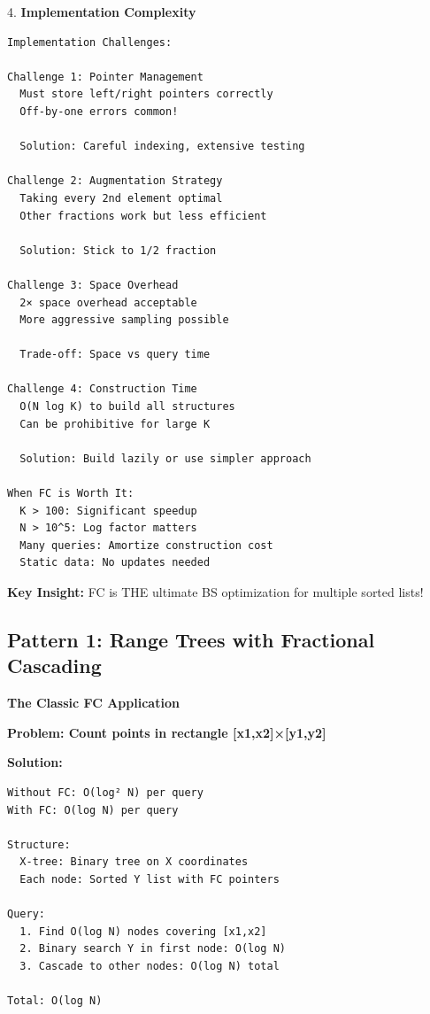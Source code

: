\documentclass[11pt,a4paper,oneside]{book}
\begin{document}
\begin{tcolorbox}[
    enhanced,breakable,
    colback=white,
    colframe=deepblue,
    boxrule=1.5pt,
    arc=3mm,
    title=\textbf{The Ultimate Search Optimization}
]
4. \textbf{Implementation Complexity}
\begin{verbatim}
Implementation Challenges:

Challenge 1: Pointer Management
  Must store left/right pointers correctly
  Off-by-one errors common!
  
  Solution: Careful indexing, extensive testing

Challenge 2: Augmentation Strategy
  Taking every 2nd element optimal
  Other fractions work but less efficient
  
  Solution: Stick to 1/2 fraction

Challenge 3: Space Overhead
  2× space overhead acceptable
  More aggressive sampling possible
  
  Trade-off: Space vs query time

Challenge 4: Construction Time
  O(N log K) to build all structures
  Can be prohibitive for large K
  
  Solution: Build lazily or use simpler approach

When FC is Worth It:
  K > 100: Significant speedup
  N > 10^5: Log factor matters
  Many queries: Amortize construction cost
  Static data: No updates needed
\end{verbatim}

\textbf{Key Insight:}
FC is THE ultimate BS optimization for multiple sorted lists!
\end{tcolorbox}

\subsection{Pattern 1: Range Trees with Fractional Cascading}

\begin{tcolorbox}[
    enhanced,breakable,
    colback=successgreen!10,
    colframe=successgreen,
    boxrule=1.5pt,
    arc=3mm,
    title=\textbf{Complete 2D Range Query Algorithms}
]
\textbf{The Classic FC Application}

\textbf{Problem: Count points in rectangle [x1,x2]×[y1,y2]}

\textbf{Solution:}
\begin{verbatim}
Without FC: O(log² N) per query
With FC: O(log N) per query

Structure:
  X-tree: Binary tree on X coordinates
  Each node: Sorted Y list with FC pointers

Query:
  1. Find O(log N) nodes covering [x1,x2]
  2. Binary search Y in first node: O(log N)
  3. Cascade to other nodes: O(log N) total

Total: O(log N)
\end{verbatim}
\end{tcolorbox}
\end{document}
